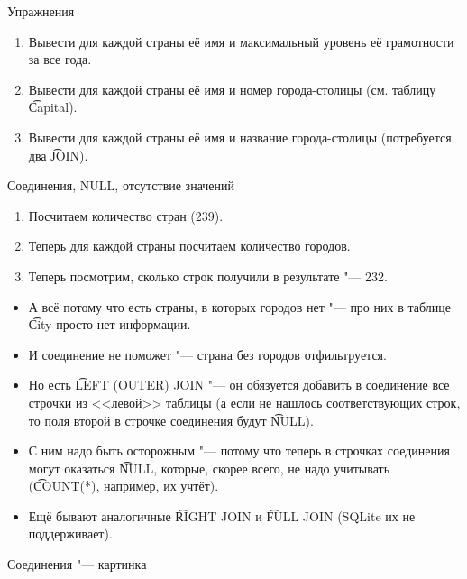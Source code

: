 \begin{frame}{Упражнения}
	\begin{enumerate}
		\item Вывести для каждой страны её имя и максимальный уровень её грамотности за все года.
		\item Вывести для каждой страны её имя и номер города-столицы (см. таблицу \t{Capital}).
		\item Вывести для каждой страны её имя и название города-столицы (потребуется два \t{JOIN}).
	\end{enumerate}
\end{frame}

\begin{frame}{Соединения, NULL, отсутствие значений}
	\begin{enumerate}
		\item Посчитаем количество стран (239).
		\item Теперь для каждой страны посчитаем количество городов.
		\item Теперь посмотрим, сколько строк получили в результате "--- 232.
	\end{enumerate}
	\begin{itemize}
		\item А всё потому что есть страны, в которых городов нет "--- про них в таблице \t{City} просто нет информации.
		\item И соединение не поможет "--- страна без городов отфильтруется.
		\item Но есть \t{LEFT (OUTER) JOIN} "--- он обязуется добавить в соединение все строчки из <<левой>> таблицы
			(а если не нашлось соответствующих строк, то поля второй в строчке соединения будут \t{NULL}).
		\item С ним надо быть осторожным "--- потому что теперь в строчках соединения могут оказаться \t{NULL},
			которые, скорее всего, не надо учитывать (\t{COUNT(*)}, например, их учтёт).
		\item Ещё бывают аналогичные \t{RIGHT JOIN} и \t{FULL JOIN} (SQLite их не поддерживает).
	\end{itemize}
\end{frame}

\begin{frame}[fragile]{Соединения "--- картинка}
\end{frame}

